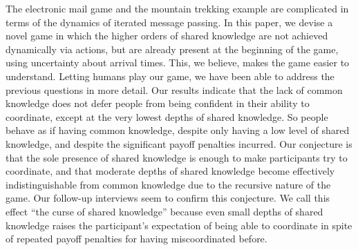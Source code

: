 \documentclass[twocolumn,a4paper,superscriptaddress,nofootinbib]{revtex4}
\newcommand{\tobo}[1]{{\color{red} TOBO: #1}}
\newcommand{\tsn}[1]{{\color{blue} TSN: #1}}
\newcommand{\re}[1]{{\color{brown} RE: #1}}
\begin{document}
The electronic mail game and the mountain trekking example are complicated in terms of the dynamics of iterated message passing. In this paper, we devise a novel game in which the higher orders of shared knowledge are not achieved dynamically via actions, but are already present at the beginning of the game, using uncertainty about arrival times. This, we believe, makes the game easier to understand. Letting humans play our game, we have been able to address the previous questions in more detail. Our results indicate that the lack of common knowledge does not defer people from being confident in their ability to coordinate, except at the very lowest depths of shared knowledge. So people behave as if having common knowledge, despite only having a low level of shared knowledge, and despite the significant payoff penalties incurred. %
Our conjecture is that the sole presence of shared knowledge is enough to make participants try to coordinate, and that moderate depths of shared knowledge become effectively indistinguishable from common knowledge due to the recursive nature of the game. Our follow-up interviews seem to confirm this conjecture. 
We call this effect ``the curse of shared knowledge'' because even small depths of shared knowledge raises the participant's expectation of being able to coordinate in spite of repeated payoff penalties for having miscoordinated before.
\end{document}
